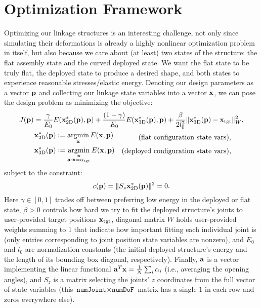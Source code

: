 \documentclass[10pt]{article}
\title{\documenttitle}
\author{Julian Panetta}
\DeclareMathOperator*{\argmin}{argmin}
\newcommand{\defeq}{\vcentcolon=}
\providecommand{\norm}[1]{\lVert#1\rVert}
\renewcommand{\vec}[1]{{\bf #1}}
\def\a{\vec{a}}
\def\x{\vec{x}}
\def\p{\vec{p}}
\def\xflat{\vec{x}^*_\text{2D}}
\def\xdeploy{\vec{x}^*_\text{3D}}
\def\xtgt{\vec{x}_\text{tgt}}
\begin{document}
\maketitle

\section{Optimization Framework}
Optimizing our linkage structures is an interesting challenge, not only since simulating their deformations is already a highly nonlinear optimization problem in itself,
but also because we care about (at least) two states of the structure: the flat assembly state and the curved deployed state.
We want the flat state to be truly flat, the deployed state to produce a desired shape, and both states to experience reasonable stresses/elastic energy.
Denoting our design parameters as a vector $\p$ and collecting our linkage
state variables into a vector $\x$, we can pose the design problem as
minimizing the objective:
\begin{gather}
\label{eqn:J}
J(\p) = \frac{\gamma}{E_0} E(\xflat(\p), \p) + \frac{(1 - \gamma)}{E_0} E(\xdeploy(\p), \p) + \frac{\beta}{2 l_0^2} \norm{\xdeploy(\p) - \xtgt}_W^2, \\ \notag
    \quad \quad \quad
    \begin{aligned}
        \xflat(\p) &\defeq \argmin_\x E(\x, \p) \\
        \xdeploy(\p) &\defeq \argmin_{\substack{\x \\ \a \cdot \x = \alpha_\text{tgt}}} E(\x, \p)
    \end{aligned} \quad
    \begin{aligned}
        \text{    (flat configuration state vars),}\phantom{\min_x E}&\\
        \text{(deployed configuration state vars),}\phantom{\min_{\substack{x \\ x}} E}&
    \end{aligned}
\end{gather}
subject to the constraint:
\begin{equation}
\label{eqn:c}
c(\p) = \norm{S_z \xflat(\p)}^2 = 0.
\end{equation}
%
Here $\gamma \in [0, 1]$ trades off between preferring low energy in the deployed or flat state, $\beta > 0$ controls how hard we try to fit the deployed structure's joints to
user-provided target positions $\xtgt$, diagonal matrix $W$ holds user-provided weights summing to 1 that indicate how important fitting each individual joint is (only entries corresponding to joint position state variables are nonzero),
and $E_0$ and $l_0$ are normalization constants (the initial deployed structure's energy and the length of its bounding box diagonal, respectively).
Finally, $\a$ is a vector implementing the linear functional $\a^T\x = \frac{1}{N} \sum_i \alpha_i$ (i.e., averaging the opening angles), and
$S_z$ is a matrix selecting the joints' $z$ coordinates from the full
vector of state variables (this $\texttt{numJoint} \times \texttt{numDoF}$
matrix has a single $1$ in each row and zeros everywhere else).
\end{document}
